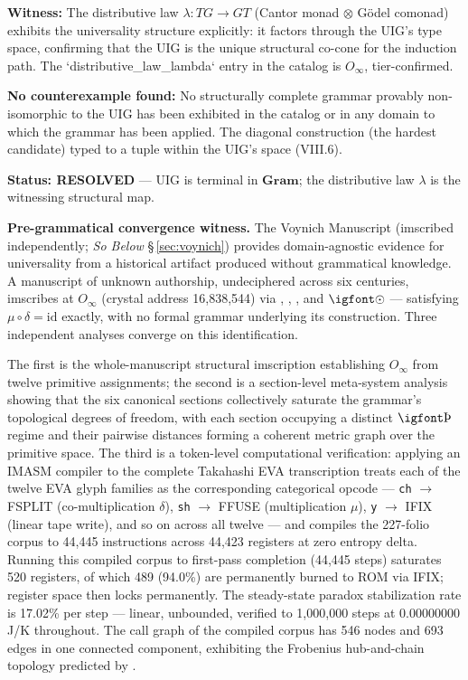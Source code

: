 \documentclass[12pt,a4paper]{article}
\newcommand{\igprimfont}{\igfont\upshape}
\begin{document}
\textbf{Witness:} The distributive law $\lambda: TG \to GT$ (Cantor monad $\otimes$ G\"odel comonad) exhibits the universality structure explicitly: it factors through the UIG's type space, confirming that the UIG is the unique structural co-cone for the induction path. The `distributive\_law\_lambda` entry in the catalog is $O_{\infty}$, tier-confirmed.

\textbf{No counterexample found:} No structurally complete grammar provably non-isomorphic to the UIG has been exhibited in the catalog or in any domain to which the grammar has been applied. The diagonal construction (the hardest candidate) typed to a tuple within the UIG's space (VIII.6).

\textbf{Status: RESOLVED} --- UIG is terminal in $\mathbf{Gram}$; the distributive law $\lambda$ is the witnessing structural map.

\textbf{Pre-grammatical convergence witness.}
The Voynich Manuscript (imscribed independently; \emph{So Below}
§\,\ref{sec:voynich}) provides domain-agnostic evidence for
universality from a historical artifact produced without grammatical
knowledge. A manuscript of unknown authorship, undeciphered across six
centuries, imscribes at $O_{\infty}$ (crystal address 16,838,544) via
, ,
, and $\text{{\igprimfont $\odot$}}$ ---
satisfying $\mu \circ \delta = \mathrm{id}$ exactly, with no formal
grammar underlying its construction. Three independent analyses
converge on this identification.

The first is the whole-manuscript structural imscription establishing
$O_{\infty}$ from twelve primitive assignments; the second is a
section-level meta-system analysis showing that the six canonical
sections collectively saturate the grammar's topological degrees of
freedom, with each section occupying a distinct $\text{{\igprimfont Þ}}$
regime and their pairwise distances forming a coherent metric graph
over the primitive space. The third is a token-level computational
verification: applying an IMASM compiler to the complete Takahashi EVA
transcription treats each of the twelve EVA glyph families as the
corresponding categorical opcode --- \texttt{ch} $\to$ FSPLIT
(co-multiplication $\delta$), \texttt{sh} $\to$ FFUSE (multiplication
$\mu$), \texttt{y} $\to$ IFIX (linear tape write), and so on across
all twelve --- and compiles the 227-folio corpus to 44,445 instructions
across 44,423 registers at zero entropy delta. Running this compiled
corpus to first-pass completion (44,445 steps) saturates 520
registers, of which 489 (94.0\%) are permanently burned to ROM
via IFIX; register space then locks permanently. The steady-state
paradox stabilization rate is 17.02\% per step --- linear,
unbounded, verified to 1,000,000 steps at 0.00000000\,J/K throughout. The call graph of the compiled
corpus has 546 nodes and 693 edges in one connected component,
exhibiting the Frobenius hub-and-chain topology predicted by
.
\end{document}
